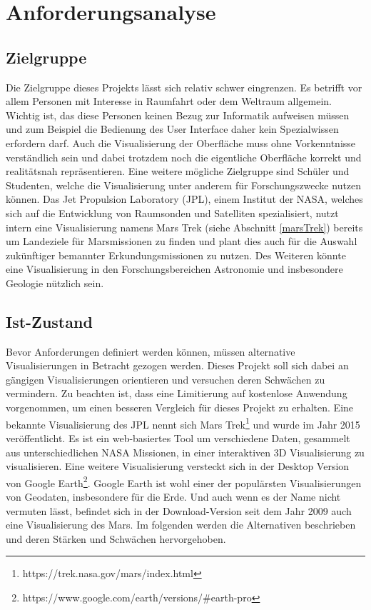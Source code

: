 \chapter{Anforderungsanalyse}\label{chapter3}

\section{Zielgruppe}
Die Zielgruppe dieses Projekts lässt sich relativ schwer eingrenzen. Es betrifft vor allem Personen mit Interesse in Raumfahrt oder dem Weltraum allgemein. Wichtig ist, das diese Personen keinen Bezug zur Informatik aufweisen müssen und zum Beispiel die Bedienung des User Interface daher kein Spezialwissen erfordern darf. Auch die Visualisierung der Oberfläche muss ohne Vorkenntnisse verständlich sein und dabei trotzdem noch die eigentliche Oberfläche korrekt und realitätsnah repräsentieren. Eine weitere mögliche Zielgruppe sind Schüler und Studenten, welche die Visualisierung unter anderem für Forschungszwecke nutzen können. Das Jet Propulsion Laboratory (JPL), einem Institut der NASA, welches sich auf die Entwicklung von Raumsonden und Satelliten spezialisiert, nutzt intern eine Visualisierung namens Mars Trek (siehe Abschnitt \ref{marsTrek}) bereits um Landeziele für Marsmissionen zu finden und plant dies auch für die Auswahl zukünftiger bemannter Erkundungsmissionen zu nutzen\cite{marsTrek}. Des Weiteren könnte eine Visualisierung in den Forschungsbereichen Astronomie und insbesondere Geologie nützlich sein.

\section{Ist-Zustand}\label{istZustand}
Bevor Anforderungen definiert werden können, müssen alternative Visualisierungen in Betracht gezogen werden. Dieses Projekt soll sich dabei an gängigen Visualisierungen orientieren und versuchen deren Schwächen zu vermindern. Zu beachten ist, dass eine Limitierung auf kostenlose Anwendung vorgenommen, um einen besseren Vergleich für dieses Projekt zu erhalten. Eine bekannte Visualisierung des JPL nennt sich Mars Trek\footnote{https://trek.nasa.gov/mars/index.html} und wurde im Jahr 2015 veröffentlicht. Es ist ein web-basiertes Tool um verschiedene Daten, gesammelt aus unterschiedlichen NASA Missionen, in einer interaktiven 3D Visualisierung zu visualisieren. Eine weitere Visualisierung versteckt sich in der Desktop Version von Google Earth\footnote{https://www.google.com/earth/versions/\#earth-pro}. Google Earth ist wohl einer der populärsten Visualisierungen von Geodaten, insbesondere für die Erde. Und auch wenn es der Name nicht vermuten lässt, befindet sich in der Download-Version seit dem Jahr 2009 auch eine Visualisierung des Mars. Im folgenden werden die Alternativen beschrieben und deren Stärken und Schwächen hervorgehoben.

